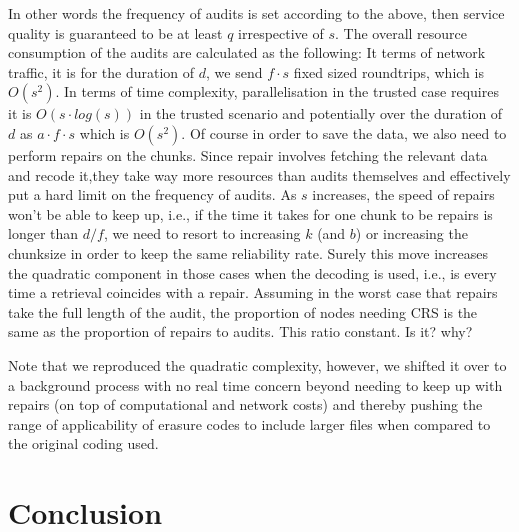 \documentclass[12pt]{article}
\begin{document}
In other words the frequency of audits is set according to the above, then service quality is guaranteed to be at least $q$ irrespective of $s$. The overall resource consumption of the audits are calculated as the following:
It terms of network traffic, it is for the duration of $d$, we send $f\cdot s$ fixed sized roundtrips, which is $O(s^2)$. In terms of time complexity, parallelisation in the trusted case requires it is $O(s\cdot log(s))$ in the trusted scenario and potentially
over the duration of $d$ as $a\cdot f\cdot s$ which is $O(s^2)$.
Of course in order to save the data, we also need to perform repairs on the chunks. Since repair involves fetching the relevant data and recode it,they take way more resources than audits themselves and effectively put a hard limit on the frequency of audits.
As $s$ increases, the speed of repairs won't be able to keep up, i.e., if the time it takes for one chunk to be repairs is longer than $d/f$, we need to resort to increasing $k$ (and $b$) or increasing the chunksize in order to keep the same reliability rate.
Surely this move increases the quadratic component in those cases when the decoding is used, i.e., is every time a retrieval coincides with a repair. Assuming in the worst case that repairs take the full length of the audit, the proportion of nodes needing CRS is the same as the proportion of repairs to audits. This ratio constant. Is it? why?

Note that we reproduced the quadratic complexity, however, we shifted it over to a background process with no real time concern beyond needing to keep up with repairs (on top of computational and network costs) and thereby pushing the range of applicability of erasure codes to include larger files when compared to the original coding used.

\section{Conclusion}


\end{document}
